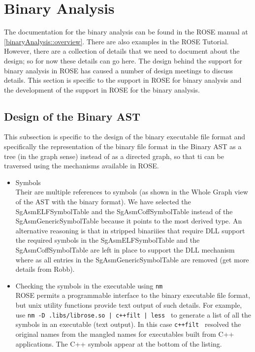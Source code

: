
\section{Binary Analysis}%


   The documentation for the binary analysis can be found in the ROSE manual at
\ref{binaryAnalysis::overview}.  There are also examples in the ROSE Tutorial.
However, there are a collection of details 
that we need to document about the design; so for now these details can go here.
   The design behind the support for binary analysis in ROSE has caused a number of
design meetings to discuss details.  This section is specific to the support
in ROSE for binary analysis and the development of the support in ROSE for the 
binary analysis.

\subsection{Design of the Binary AST}

This subsection is specific to the design of the binary executable file format
and specifically the representation of the binary file format in the Binary AST 
as a tree (in the graph sense) instead of as a directed graph, so that ti can be 
traversed using the mechanisms available in ROSE.

\begin{itemize}
   \item Symbols \\
Their are multiple references to symbols (as shown in the Whole Graph view of the AST with 
the binary format).  We have selected the SgAsmELFSymbolTable and the SgAsmCoffSymbolTable
instead of the SgAsmGenericSymbolTable because it points to the most derived type.
An alternative reasoning is that in stripped binariiies that require DLL support
the required symbols in the SgAsmELFSymbolTable and the SgAsmCoffSymbolTable are 
left in place to support the DLL mechanism where as all entries in the
SgAsmGenericSymbolTable are removed (get more details from Robb). 

   \item Checking the symbols in the executable using {\tt nm} \\
ROSE permits a programmable interface to the binary executable file format,
but unix utility functions provide text output of such details. For example,
use {\tt nm -D .libs/librose.so | c++filt | less } to generate a list of
all the symbols in an executable (text output).  In this case {\tt c++filt }
resolved the original names from the mangled names for executables built from 
C++ applications.  The C++ symbols appear at the bottom of the listing.

\end{itemize}


